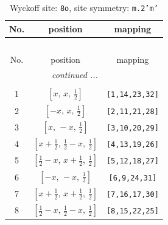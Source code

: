 \documentclass[fleqn,8pt]{jsarticle}
\begin{document}
\begin{longtable}{ccc}
\caption{Wyckoff site: {\tt 8o}, site symmetry: {\tt m.2'm'}}
 \\
 \hline \hline
No. & position & mapping \\ \hline \endfirsthead

\multicolumn{2}{l}{\tablename\ \thetable{}} \\
 \hline \hline
No. & position & mapping \\ \hline \endhead

 \hline \hline
\multicolumn{2}{r}{\footnotesize\it continued ...} \\ \endfoot

 \hline \hline
\multicolumn{2}{r}{} \\ \endlastfoot

1 & $\left[ x,\, x,\, \frac{1}{2} \right]$ & {\tt [1,14,23,32]} \\ \hline
2 & $\left[ - x,\, x,\, \frac{1}{2} \right]$ & {\tt [2,11,21,28]} \\ \hline
3 & $\left[ x,\, - x,\, \frac{1}{2} \right]$ & {\tt [3,10,20,29]} \\ \hline
4 & $\left[ x + \frac{1}{2},\, \frac{1}{2} - x,\, \frac{1}{2} \right]$ & {\tt [4,13,19,26]} \\ \hline
5 & $\left[ \frac{1}{2} - x,\, x + \frac{1}{2},\, \frac{1}{2} \right]$ & {\tt [5,12,18,27]} \\ \hline
6 & $\left[ - x,\, - x,\, \frac{1}{2} \right]$ & {\tt [6,9,24,31]} \\ \hline
7 & $\left[ x + \frac{1}{2},\, x + \frac{1}{2},\, \frac{1}{2} \right]$ & {\tt [7,16,17,30]} \\ \hline
8 & $\left[ \frac{1}{2} - x,\, \frac{1}{2} - x,\, \frac{1}{2} \right]$ & {\tt [8,15,22,25]} \\
\end{longtable}
\renewcommand{\arraystretch}{1.2}
\end{document}
